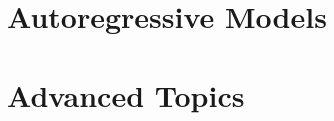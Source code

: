 \documentclass[11pt]{book}
\theoremstyle{definition}
\begin{document}






\part{Autoregressive Models}



\part{Advanced Topics}








\backmatter




\printindex
\end{document}
